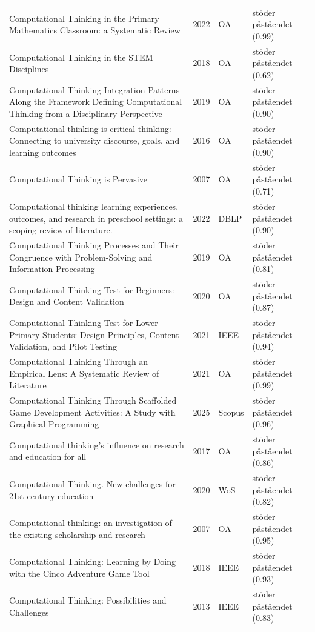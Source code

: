 \begin{longtable}{@{}%
  >{\raggedright\arraybackslash}p{}c%
  >{\raggedright\arraybackslash}p{}%
  >{\raggedright\arraybackslash}p{}@{}}
Computational Thinking in the Primary Mathematics Classroom: a Systematic Review & 2022 & OA & stöder påståendet (0.99) \\
Computational Thinking in the STEM Disciplines & 2018 & OA & stöder påståendet (0.62) \\
Computational Thinking Integration Patterns Along the Framework Defining Computational Thinking from a Disciplinary Perspective & 2019 & OA & stöder påståendet (0.90) \\
Computational thinking is critical thinking: Connecting to university discourse, goals, and learning outcomes & 2016 & OA & stöder påståendet (0.90) \\
Computational Thinking is Pervasive & 2007 & OA & stöder påståendet (0.71) \\
Computational thinking learning experiences, outcomes, and research in preschool settings: a scoping review of literature. & 2022 & DBLP & stöder påståendet (0.90) \\
Computational Thinking Processes and Their Congruence with Problem-Solving and Information Processing & 2019 & OA & stöder påståendet (0.81) \\
Computational Thinking Test for Beginners: Design and Content Validation & 2020 & OA & stöder påståendet (0.87) \\
Computational Thinking Test for Lower Primary Students: Design Principles, Content Validation, and Pilot Testing & 2021 & IEEE & stöder påståendet (0.94) \\
Computational Thinking Through an Empirical Lens: A Systematic Review of Literature & 2021 & OA & stöder påståendet (0.99) \\
Computational Thinking Through Scaffolded Game Development Activities: A Study with Graphical Programming & 2025 & Scopus & stöder påståendet (0.96) \\
Computational thinking's influence on research and education for all & 2017 & OA & stöder påståendet (0.86) \\
Computational Thinking. New challenges for 21st century education & 2020 & WoS & stöder påståendet (0.82) \\
Computational thinking: an investigation of the existing scholarship and research & 2007 & OA & stöder påståendet (0.95) \\
Computational Thinking: Learning by Doing with the Cinco Adventure Game Tool & 2018 & IEEE & stöder påståendet (0.93) \\
Computational Thinking: Possibilities and Challenges & 2013 & IEEE & stöder påståendet (0.83) \\

\end{longtable}
